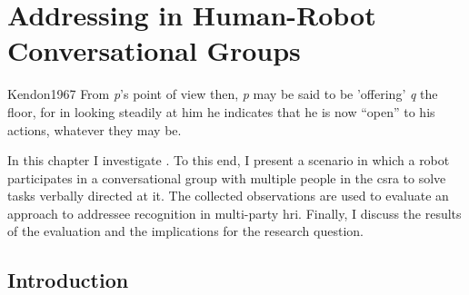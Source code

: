 \chapter{Addressing in Human-Robot Conversational Groups}\label{ch.meka}


\begin{displaycquote}[p. 36]{Kendon1967}
From \emph{p}'s point of view then, \emph{p} may be said to be 'offering' \emph{q} the floor, for in looking steadily at him he indicates that he is now \enquote{open} to his actions, whatever they may be.\\
\end{displaycquote}

In this chapter I investigate .
To this end, I present a scenario in which a \gls{robot} participates in a \gls{conversational group} with multiple people in the \gls{csra} to solve tasks verbally directed at it.
The collected observations are used to evaluate an approach to \gls{addressee} recognition in multi-party \acrlong{hri}.
Finally, I discuss the results of the evaluation and the implications for the research question.

\section{Introduction}

